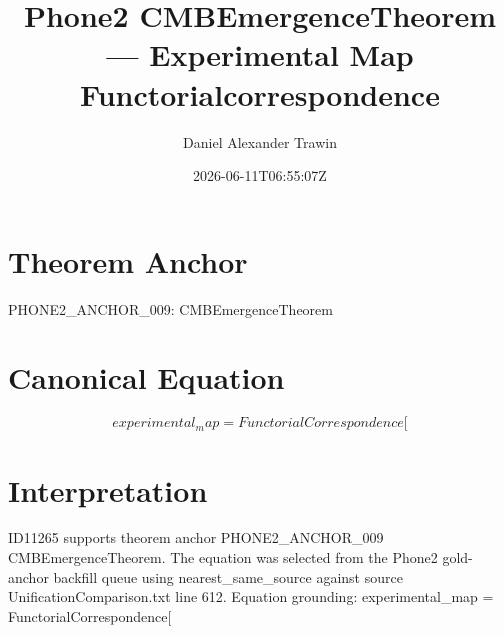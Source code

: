 \documentclass[11pt]{article}
\title{Phone2 CMBEmergenceTheorem — Experimental Map Functorialcorrespondence}
\author{Daniel Alexander Trawin}
\date{2026-06-11T06:55:07Z}
\begin{document}
\maketitle
\section*{Theorem Anchor}
PHONE2_ANCHOR_009: CMBEmergenceTheorem
\section*{Canonical Equation}
\[
experimental_map = FunctorialCorrespondence[
\]
\section*{Interpretation}
ID11265 supports theorem anchor PHONE2_ANCHOR_009 CMBEmergenceTheorem. The equation was selected from the Phone2 gold-anchor backfill queue using nearest_same_source against source UnificationComparison.txt line 612. Equation grounding: experimental_map = FunctorialCorrespondence[
\end{document}
